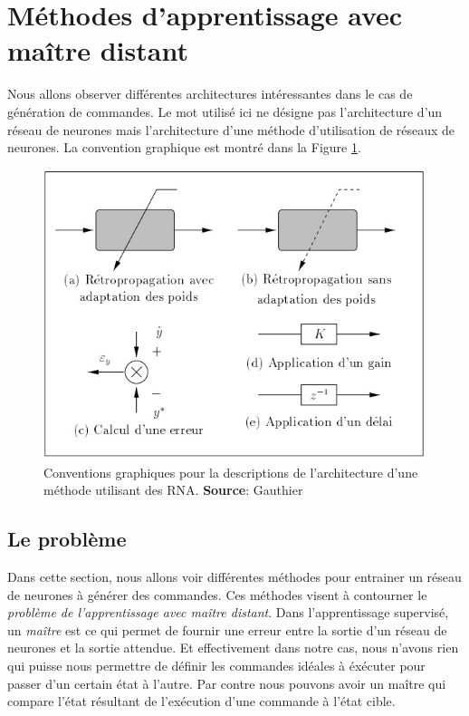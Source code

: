 \section{Méthodes d'apprentissage avec maître distant}
Nous allons observer différentes architectures intéressantes dans le cas de génération de commandes.
Le mot  utilisé ici ne désigne pas l'architecture d'un réseau de neurones mais l'architecture d'une méthode d'utilisation de réseaux de neurones.
La convention graphique est montré dans la Figure \ref{legendearchi}.
\begin{figure}
 \centering
 \includegraphics[scale=0.6]{../figures/applegende.jpg}
 \caption{Conventions graphiques pour la descriptions de l'architecture d'une méthode utilisant des RNA. \textbf{Source}: Gauthier\cite{Gauthier}}
 \label{legendearchi}
\end{figure}

\subsection{Le problème}
Dans cette section, nous allons voir différentes méthodes pour entrainer un réseau de neurones à générer des commandes.
Ces méthodes visent à contourner le \emph{problème de l'apprentissage avec maître distant}.
Dans l'apprentissage supervisé, un \emph{maître} est ce qui permet de fournir une erreur entre la sortie d'un réseau de neurones et la sortie attendue.
Et effectivement dans notre cas, nous n'avons rien qui puisse nous permettre de définir les commandes idéales à éxécuter pour passer d'un certain état à l'autre.
Par contre nous pouvons avoir un maître qui compare l'état résultant de l'exécution d'une commande à l'état cible.


